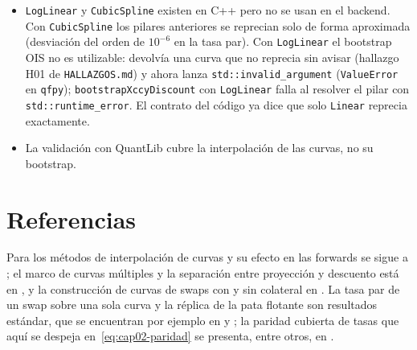 \begin{limites}
\begin{itemize}
          escenario: un forward FX con colateral USD apenas reacciona a un choque de SOFR.
    \item \texttt{LogLinear} y \texttt{CubicSpline} existen en C++ pero no se usan en el backend. Con
          \texttt{CubicSpline} los pilares anteriores se reprecian solo de forma aproximada (desviación del orden
          de $10^{-6}$ en la tasa par). Con \texttt{LogLinear} el bootstrap OIS no es utilizable: devolvía una
          curva que no reprecia sin avisar (hallazgo H01 de \texttt{HALLAZGOS.md}) y ahora
           lanza \texttt{std::invalid\_argument}
          (\texttt{ValueError} en \texttt{qfpy}); \texttt{bootstrapXccyDiscount} con \texttt{LogLinear} falla al
          resolver el pilar con \texttt{std::runtime\_error}. El contrato del código ya dice que solo \texttt{Linear}
          reprecia exactamente.
    \item La validación con QuantLib cubre la interpolación de las curvas, no su bootstrap.
  \end{itemize}
\end{limites}

\section{Referencias}\label{sec:cap02-referencias}

Para los métodos de interpolación de curvas y su efecto en las forwards se sigue a \citet{hagan2006}; el marco de
curvas múltiples y la separación entre proyección y descuento está en \citet{ametrano2013}, y la construcción de
curvas de swaps con y sin colateral en \citet{fujii2009}. La tasa par de un swap sobre una sola curva y la réplica de la
pata flotante son resultados estándar, que se encuentran por ejemplo en \citet{brigo2006} y \citet{andersen2010}; la
paridad cubierta de tasas que aquí se despeja en~\eqref{eq:cap02-paridad} se presenta, entre otros, en \citet{hull2018}.
